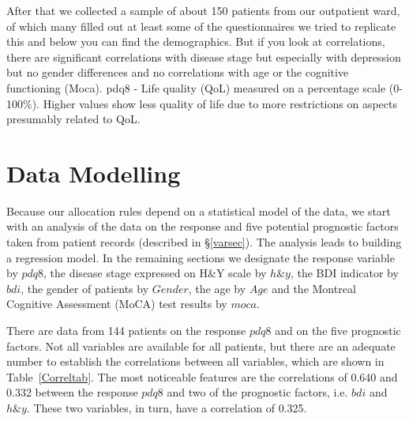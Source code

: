 \documentclass[number,12pt,review]{elsarticle}
\begin{document}
After that we collected a sample of about 150 patients from our outpatient ward, of which many filled out at least some of the questionnaires we tried to replicate this and below you can find the demographics. But if you look at correlations, there are significant correlations with disease stage but especially with depression but no gender differences and no correlations with age or the cognitive functioning (Moca). pdq8 - Life quality (QoL) measured on a percentage scale (0-100\%). Higher values show less quality of life due to more restrictions on aspects presumably related to QoL.
	
\section{Data Modelling}

\label{datmodsec}

Because our allocation rules depend on a statistical model of the data, we start with an analysis of the data on the response and five potential prognostic factors taken from patient records (described in \S\ref{varsec}). The analysis leads to building a regression model. In the remaining sections we designate
the response variable by $pdq8$, the disease stage expressed on H\&Y scale by $h\&y$, the BDI indicator by $bdi$,
the gender of patients by $Gender$, the age by $Age$ and the Montreal Cognitive Assessment (MoCA) test \citep{nasreddine2005montreal} results by $moca$.

There are data from 144 patients on the response $pdq8$ and on the five prognostic factors. Not all variables are available for all patients, but there are an adequate number to establish the correlations between all variables, which are shown in Table~\ref{Correltab}. The most noticeable features are the correlations of 0.640 and 0.332 between the response $pdq8$ and two of the prognostic factors, i.e. $bdi$ and $h\&y$. These two variables, in turn, have a correlation of 0.325.

\begin{table}[ht]
\end{table}
\end{document}
